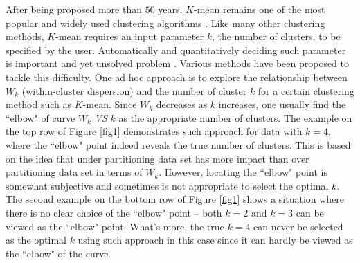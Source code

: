 \documentclass[11pt]{article}
\begin{document}
After being proposed more than $50$ years, $K$-mean remains one of the most popular and widely used clustering algorithms \citep{jain2010data}. Like many other clustering methods, $K$-mean requires an input parameter $k$, the number of clusters, to be specified by the user. Automatically and quantitatively deciding such parameter is important and yet unsolved problem \citep{fujita2014non}. Various methods have been proposed to tackle this difficulty. One ad hoc approach is to explore the relationship between $W_k$ (within-cluster dispersion) and the number of cluster $k$ for a certain clustering method such as $K$-mean. Since $W_k$ decreases as $k$ increases, one usually find the ``elbow" of curve $W_k$ \textsl{VS} $k$ as the appropriate number of clusters. The example on the top row of Figure \ref{fig1} demonstrates such approach for data with $k=4$, where the ``elbow" point indeed reveals the true number of clusters. This is based on the idea that under partitioning data set has more impact than over partitioning data set in terms of $W_k$. However, locating the ``elbow" point is somewhat subjective and sometimes is not appropriate to select the optimal $k$. The second example on the bottom row of Figure \ref{fig1} shows a  situation where there is no clear choice of the ``elbow" point -- both $k=2$ and $k=3$ can be viewed as the ``elbow" point. What's more, the true $k=4$ can never be selected as the optimal $k$ using such approach in this case since it can hardly be viewed as the ``elbow" of the curve.
\end{document}
